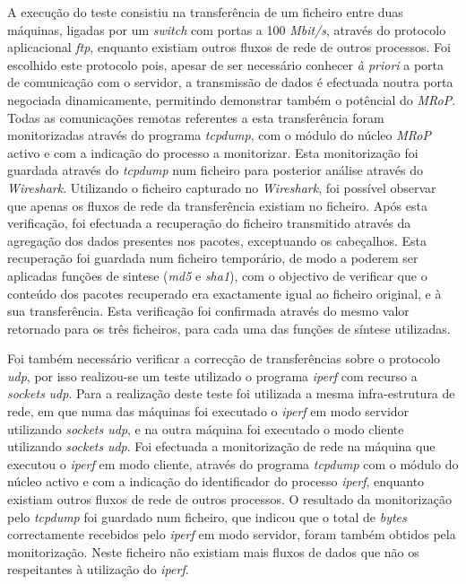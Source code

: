 A execução do teste consistiu na transferência de um ficheiro entre duas máquinas, ligadas por um \textit{switch} com portas a 100 \textit{Mbit/s}, através do protocolo aplicacional \textit{ftp}, enquanto existiam outros fluxos de rede de outros processos.
Foi escolhido este protocolo pois, apesar de ser necessário conhecer \textit{à priori} a porta de comunicação com o servidor, a transmissão de dados é efectuada noutra porta negociada dinamicamente, permitindo demonstrar também o potêncial do \textit{MRoP}.
Todas as comunicações remotas referentes a esta transferência foram monitorizadas através do programa \textit{tcpdump}, com o módulo do núcleo \textit{MRoP} activo e com a indicação do processo a monitorizar.
Esta monitorização foi guardada através do \textit{tcpdump} num ficheiro para posterior análise através do \textit{Wireshark}.
Utilizando o ficheiro capturado no \textit{Wireshark}, foi possível observar que apenas os fluxos de rede da transferência existiam no ficheiro.
Após esta verificação, foi efectuada a recuperação do ficheiro transmitido através da agregação dos dados presentes nos pacotes, exceptuando os cabeçalhos.
Esta recuperação foi guardada num ficheiro temporário, de modo a poderem ser aplicadas funções de sintese (\textit{md5} e \textit{sha1}), com o objectivo de verificar que o conteúdo dos pacotes recuperado era exactamente igual ao ficheiro original, e à sua transferência.
Esta verificação foi confirmada através do mesmo valor retornado para os três ficheiros, para cada uma das funções de síntese utilizadas.

Foi também necessário verificar a correcção de transferências sobre o protocolo \textit{udp}, por isso realizou-se um teste utilizado o programa \textit{iperf} com recurso a \textit{sockets} \textit{udp}.
Para a realização deste teste foi utilizada a mesma infra-estrutura de rede, em que numa das máquinas foi executado o \textit{iperf} em modo servidor utilizando \textit{sockets udp}, e na outra máquina foi executado o modo cliente utilizando \textit{sockets} \textit{udp}.
Foi efectuada a monitorização de rede na máquina que executou o \textit{iperf} em modo cliente, através do programa \textit{tcpdump} com o módulo do núcleo activo e com a indicação do identificador do processo \textit{iperf}, enquanto existiam outros fluxos de rede de outros processos.
O resultado da monitorização pelo \textit{tcpdump} foi guardado num ficheiro, que indicou que o total de \textit{bytes} correctamente recebidos pelo \textit{iperf} em modo servidor, foram também obtidos pela monitorização.
Neste ficheiro não existiam mais fluxos de dados que não os respeitantes à utilização do \textit{iperf}.

